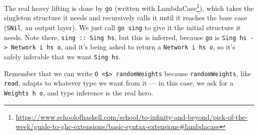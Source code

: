 \documentclass[]{article}
\newenvironment{Shaded}{}{}
\newcommand{\CommentTok}[1]{\textcolor[rgb]{0.38,0.63,0.69}{\textit{#1}}}
\newcommand{\DataTypeTok}[1]{\textcolor[rgb]{0.56,0.13,0.00}{#1}}
\newcommand{\KeywordTok}[1]{\textcolor[rgb]{0.00,0.44,0.13}{\textbf{#1}}}
\newcommand{\NormalTok}[1]{#1}
\newcommand{\OperatorTok}[1]{\textcolor[rgb]{0.40,0.40,0.40}{#1}}
\newcommand{\OtherTok}[1]{\textcolor[rgb]{0.00,0.44,0.13}{#1}}
\renewcommand{\href}[2]{#2\footnote{\url{#1}}}
\begin{document}
\begin{Shaded}
\end{Shaded}

The real heavy lifting is done by \texttt{go} (written with
\href{https://www.schoolofhaskell.com/school/to-infinity-and-beyond/pick-of-the-week/guide-to-ghc-extensions/basic-syntax-extensions\#lambdacase}{LambdaCase}),
which takes the singleton structure it needs and recursively calls it until it
reaches the base case (\texttt{SNil}, an output layer). We just call
\texttt{go\ sing} to give it the initial structure it needs. Note there,
\texttt{sing\ ::\ Sing\ hs}, but this is inferred, because \texttt{go} is
\texttt{Sing\ hs\ -\textgreater{}\ Network\ i\ hs\ o}, and it's being asked to
return a \texttt{Network\ i\ hs\ o}, so it's safely inferable that we want
\texttt{Sing\ hs}.

Remember that we can write
\texttt{O\ \textless{}\$\textgreater{}\ randomWeights} because
\texttt{randomWeights}, like \texttt{read}, adapts to whatever type we want from
it --- in this case, we ask for a \texttt{Weights\ h\ o}, and type inference is
the real hero.
\end{document}
